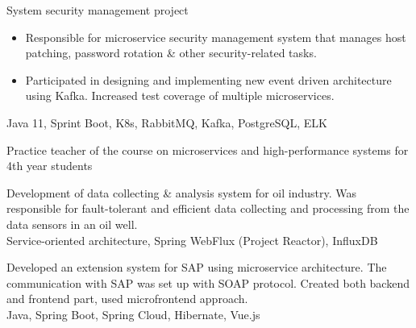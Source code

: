 \documentclass[10pt,a4paper,ragged2e,withhyper]{altacv}
\begin{document}
\begin{paracol}{2}


System security management project
\begin{itemize}
\item Responsible for microservice security management system that manages host patching, password rotation \& other security-related tasks.
\item Participated in designing and implementing new event driven architecture using Kafka. Increased test coverage of multiple microservices.
\end{itemize}
Java 11, Sprint Boot, K8s, RabbitMQ, Kafka, PostgreSQL, ELK

\divider


Practice teacher of the course on microservices and high-performance systems for 4th year students


\divider


Development of data collecting \& analysis system for oil industry. Was responsible for fault-tolerant and efficient data collecting and processing from the data sensors in an oil well.\\
Service-oriented architecture, Spring WebFlux (Project Reactor), InfluxDB

\divider


Developed an extension system for SAP using microservice architecture. The communication with SAP was set up with SOAP protocol. Created both backend and frontend part, used microfrontend approach.\\
Java, Spring Boot, Spring Cloud, Hibernate, Vue.js

\switchcolumn


\end{paracol}
\end{document}
